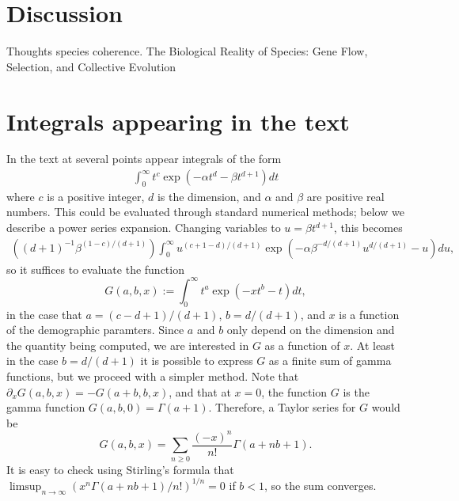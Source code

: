 \documentclass{article}
\begin{document}





\section{Discussion}

Thoughts
species coherence.
The Biological Reality of Species: Gene Flow, Selection, and Collective Evolution




\appendix

\section{Integrals appearing in the text}
    \label{apx:integrals}

In the text at several points appear integrals of the form
\begin{align}
  \int_0^\infty t^c \exp \left( - \alpha t^d - \beta t^{d+1} \right) dt 
\end{align}
where $c$ is a positive integer, $d$ is the dimension, and $\alpha$ and $\beta$ are positive real numbers.
This could be evaluated through standard numerical methods; below we describe a power series expansion.
Changing variables to $u = \beta t^{d+1}$, this becomes
\begin{align}
    \left( (d+1)^{-1} \beta^{ (1-c)/(d+1) } \right) \int_0^\infty u^{(c+1-d)/(d+1)} \exp\left( - \alpha \beta^{-d/(d+1)} u^{d/(d+1)} - u \right) du ,
\end{align}
so it suffices to evaluate the function
\begin{equation}
    G(a,b,x) := \int_0^\infty  t^a \exp\left( -x t^b - t \right) dt ,
\end{equation}
in the case that $a=(c-d+1)/(d+1)$, $b=d/(d+1)$, and $x$ is a function of the demographic paramters.
Since $a$ and $b$ only depend on the dimension and the quantity being computed,
we are interested in $G$ as a function of $x$.
At least in the case $b=d/(d+1)$ it is possible to express $G$ as a finite sum of gamma functions,
but we proceed with a simpler method.
Note that $\partial_x G(a,b,x) = -G(a+b,b,x)$,
and that at $x=0$, the function $G$ is the gamma function $G(a,b,0) = \Gamma(a+1)$.
Therefore, a Taylor series for $G$ would be
\[
    G(a,b,x) = \sum_{n \ge 0} \frac{(-x)^n}{n!} \Gamma(a+nb+1) .
\]
It is easy to check using Stirling's formula that $\limsup_{n \to \infty} ( x^n \Gamma(a+nb+1)/n! )^{1/n} = 0$
if $b<1$, so the sum converges.
\end{document}
